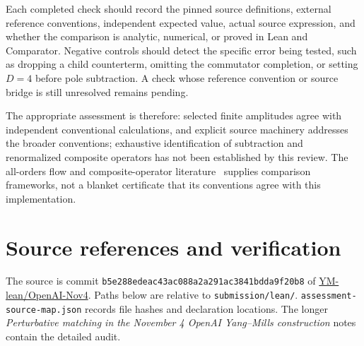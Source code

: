 \documentclass[11pt]{article}
\newcommand{\code}[1]{{\small\nolinkurl{#1}}}
\begin{document}
Each completed check should record the pinned source definitions, external
reference conventions, independent expected value, actual source expression,
and whether the comparison is analytic, numerical, or proved in Lean and
Comparator. Negative controls should detect the specific error being tested,
such as dropping a child counterterm, omitting the commutator completion, or
setting $D=4$ before pole subtraction. A check whose reference convention or
source bridge is still unresolved remains pending.

The appropriate assessment is therefore: selected finite amplitudes agree
with independent conventional calculations, and explicit source machinery
addresses the broader conventions; exhaustive identification of subtraction
and renormalized composite operators has not been established by this
review. The all-orders flow and composite-operator literature~\cite{fhh,fh} supplies
comparison frameworks, not a blanket certificate that its conventions
agree with this implementation.

\appendix
\begingroup\small
\section{Source references and verification}
\label{sec:source}

The source is commit \code{b5e288edeac43ac088a2a291ac3841bdda9f20b8} of
\href{https://github.com/yang-mills-group/OpenAI-YM-20261104}{YM-lean/OpenAI-Nov4}.
Paths below are relative to \code{submission/lean/}.
\code{assessment-source-map.json} records file hashes and declaration
locations. The longer \emph{Perturbative matching in the November 4 OpenAI
Yang--Mills construction} notes contain the detailed audit.
\end{document}
